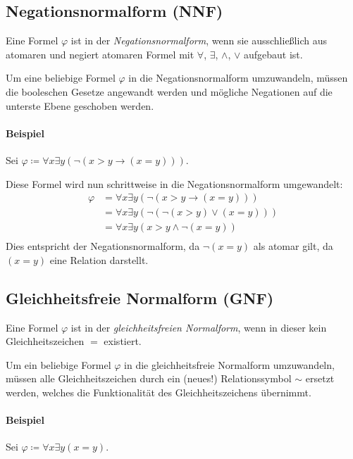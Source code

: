 		\subsection{Negationsnormalform (NNF)}
			Eine Formel $ \varphi $ ist in der \textit{Negationsnormalform}, wenn sie ausschließlich aus atomaren und negiert atomaren Formel mit $ \forall $, $ \exists $, $ \land $, $ \lor $ aufgebaut ist.

			Um eine beliebige Formel $ \varphi $ in die Negationsnormalform umzuwandeln, müssen die booleschen Gesetze angewandt werden und mögliche Negationen auf die unterste Ebene geschoben werden.

			\paragraph{Beispiel}
				Sei $ \varphi \coloneqq \forall x \exists y (\lnot (x > y \rightarrow (x = y))) $.

				Diese Formel wird nun schrittweise in die Negationsnormalform umgewandelt:
				\begin{align*}
					\varphi & = \forall x \exists y (\lnot (x > y \rightarrow (x = y)))  \\
					        & = \forall x \exists y (\lnot (\lnot (x > y) \lor (x = y))) \\
					        & = \forall x \exists y (x > y \land \lnot (x = y))          \\
				\end{align*}
				Dies entspricht der Negationsnormalform, da $ \lnot (x = y) $ als atomar gilt, da $ (x = y) $ eine Relation darstellt.

		\subsection{Gleichheitsfreie Normalform (GNF)}
			Eine Formel $ \varphi $ ist in der \textit{gleichheitsfreien Normalform}, wenn in dieser kein Gleichheitszeichen $ = $ existiert.

			Um ein beliebige Formel $ \varphi $ in die gleichheitsfreie Normalform umzuwandeln, müssen alle Gleichheitszeichen durch ein (neues!) Relationssymbol $ \sim $ ersetzt werden, welches die Funktionalität des Gleichheitszeichens übernimmt.

			\paragraph{Beispiel}
				Sei $ \varphi \coloneqq \forall x \exists y (x = y) $.

